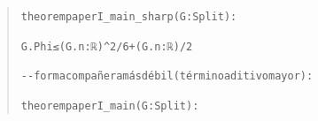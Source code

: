\documentclass[spanish,11pt,a4paper]{article}
\begin{document}
\begin{quote}
{\LeanSymbols\fontsize{8}{10}\selectfont
\noindent \nolinkurl{theorem}\hspace{0.45em}\nolinkurl{paperI_main_sharp}\hspace{0.45em}\nolinkurl{(G}\hspace{0.45em}\nolinkurl{:}\hspace{0.45em}\nolinkurl{Split)}\hspace{0.45em}\nolinkurl{:}\par
\noindent \hspace{1.8em}\nolinkurl{G.Phi}\hspace{0.45em}\nolinkurl{≤}\hspace{0.45em}\nolinkurl{(G.n}\hspace{0.45em}\nolinkurl{:}\hspace{0.45em}\nolinkurl{ℝ)}\hspace{0.45em}\nolinkurl{^}\hspace{0.45em}\nolinkurl{2}\hspace{0.45em}\nolinkurl{/}\hspace{0.45em}\nolinkurl{6}\hspace{0.45em}\nolinkurl{+}\hspace{0.45em}\nolinkurl{(G.n}\hspace{0.45em}\nolinkurl{:}\hspace{0.45em}\nolinkurl{ℝ)}\hspace{0.45em}\nolinkurl{/}\hspace{0.45em}\nolinkurl{2}\par
\noindent \par
\noindent \nolinkurl{--}\hspace{0.45em}\nolinkurl{forma}\hspace{0.45em}\nolinkurl{compañera}\hspace{0.45em}\nolinkurl{más}\hspace{0.45em}\nolinkurl{débil}\hspace{0.45em}\nolinkurl{(término}\hspace{0.45em}\nolinkurl{aditivo}\hspace{0.45em}\nolinkurl{mayor):}\par
\noindent \nolinkurl{theorem}\hspace{0.45em}\nolinkurl{paperI_main}\hspace{0.45em}\nolinkurl{(G}\hspace{0.45em}\nolinkurl{:}\hspace{0.45em}\nolinkurl{Split)}\hspace{0.45em}\nolinkurl{:}\par
}
\end{quote}
\end{document}
